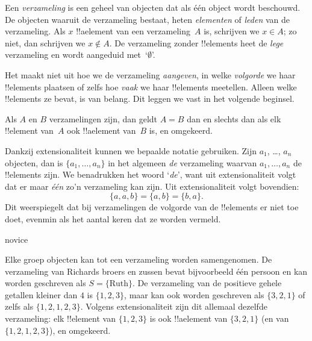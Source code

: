 \documentclass[../../../include/open-logic-section]{subfiles}
\begin{document}

Een \emph{verzameling} is een geheel van objecten dat als één
object wordt beschouwd. De objecten waaruit de verzameling bestaat,
heten \emph{elementen} of \emph{leden} van de verzameling. Als $x$
!!a{element} van een verzameling~$A$ is, schrijven we $x \in A$; zo
niet, dan schrijven we $x \notin A$. De verzameling zonder
!!{element}s heet de \emph{lege} verzameling en wordt
aangeduid met~‘$\emptyset$’.

\begin{explain}
Het maakt niet uit hoe we de verzameling \emph{aangeven}, in welke
\emph{volgorde} we haar !!{element}s plaatsen of zelfs hoe
\emph{vaak} we haar !!{element}s meetellen. Alleen welke
!!{element}s ze bevat, is van belang. Dit leggen we vast in het
volgende beginsel.
\end{explain}

\begin{defn}[Extensionaliteit]
  Als $A$ en $B$ verzamelingen zijn, dan geldt $A = B$ dan en slechts
  dan als elk !!{element} van~$A$ ook !!a{element} van~$B$ is, en
  omgekeerd.
\end{defn}

Dankzij extensionaliteit kunnen we bepaalde notatie gebruiken. Zijn
$a_{1}$, \dots, $a_{n}$ objecten, dan is $\{a_{1}, \dots, a_{n}\}$ in
het algemeen \emph{de} verzameling waarvan $a_1, \ldots, a_n$ de
!!{element}s zijn. We benadrukken het woord ‘\emph{de}’, want uit
extensionaliteit volgt dat er maar \emph{één} zo'n verzameling kan
zijn. Uit extensionaliteit volgt bovendien:
  \[
    \{a, a, b\} = \{a, b\} = \{b,a\}.
  \] 
Dit weerspiegelt dat bij verzamelingen de volgorde van de
!!{element}s er niet toe doet, evenmin als het aantal keren dat ze
worden vermeld.

\begin{tagblock}{novice}
\begin{ex}
Elke groep objecten kan tot een verzameling worden samengenomen. De
verzameling van Richards broers en zussen bevat bijvoorbeeld één
persoon en kan worden geschreven als $S=\{\textrm{Ruth}\}$. De
verzameling van de positieve gehele getallen kleiner dan $4$ is
$\{1, 2, 3\}$, maar kan ook worden geschreven als $\{3, 2, 1\}$ of
zelfs als $\{1, 2, 1, 2, 3\}$. Volgens extensionaliteit zijn dit
allemaal dezelfde verzameling: elk !!{element} van $\{1, 2, 3\}$ is
ook !!a{element} van $\{3, 2, 1\}$ (en van $\{1, 2, 1, 2, 3\}$), en
omgekeerd.
\end{ex} 
\end{tagblock}
\end{document}
